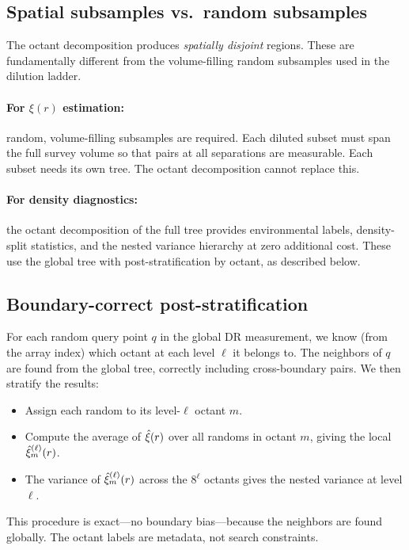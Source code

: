 \subsection{Spatial subsamples vs.\ random subsamples}
\label{sec:spatial_vs_random}

The octant decomposition produces \emph{spatially disjoint} regions.  These are fundamentally different from the volume-filling random subsamples used in the dilution ladder.

\paragraph{For $\xi(r)$ estimation:} random, volume-filling subsamples are required.  Each diluted subset must span the full survey volume so that pairs at all separations are measurable.  Each subset needs its own tree.  The octant decomposition cannot replace this.

\paragraph{For density diagnostics:} the octant decomposition of the full tree provides environmental labels, density-split statistics, and the nested variance hierarchy at zero additional cost.  These use the global tree with post-stratification by octant, as described below.

\subsection{Boundary-correct post-stratification}
\label{sec:post_stratification}

For each random query point $q$ in the global DR measurement, we know (from the array index) which octant at each level $\ell$ it belongs to.  The neighbors of $q$ are found from the global tree, correctly including cross-boundary pairs.  We then stratify the results:
\begin{itemize}[nosep]
  \item Assign each random to its level-$\ell$ octant $m$.
  \item Compute the average of $\hat{\xi}(r)$ over all randoms in octant $m$, giving the local $\hat{\xi}_m^{(\ell)}(r)$.
  \item The variance of $\hat{\xi}_m^{(\ell)}(r)$ across the $8^\ell$ octants gives the nested variance at level $\ell$.
\end{itemize}
This procedure is exact---no boundary bias---because the neighbors are found globally.  The octant labels are metadata, not search constraints.


